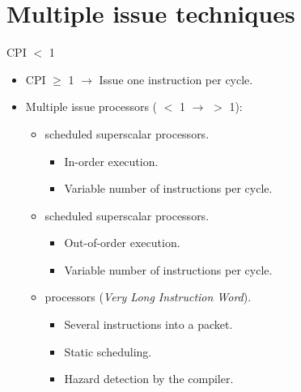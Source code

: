 \section{Multiple issue techniques}

\begin{frame}[t]{CPI $<$ 1}
\begin{itemize}
  \item CPI $\geq$ 1 $\rightarrow$ Issue one instruction per cycle.

  \item Multiple issue processors
        ( $<$ 1 $\rightarrow$  $>$ 1):
    \begin{itemize}

      \item {} scheduled superscalar processors.
        \begin{itemize}
          \item In-order execution.
          \item Variable number of instructions per cycle.
        \end{itemize}
      \item {} scheduled superscalar  processors.
        \begin{itemize}
          \item Out-of-order execution.
          \item Variable number of instructions per cycle.
        \end{itemize}
      \item {} processors (\emph{Very Long Instruction Word}).
        \begin{itemize}
          \item Several instructions into a packet.
          \item Static scheduling.
          \item Hazard detection by the compiler.
        \end{itemize}
    \end{itemize}
\end{itemize}
\end{frame}

